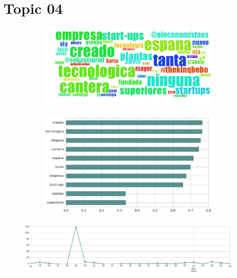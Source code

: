 \section{Topic 04}

\begin{figure}[htbp!]
    \centering
    \begin{subfigure}[b]{0.49\textwidth}
        \includegraphics[width=\textwidth]{twitter_all/report_images/topic-04-wordcloud.jpg}
    \end{subfigure}
    \begin{subfigure}[b]{0.49\textwidth}
        \includegraphics[width=\textwidth]{twitter_all/report_images/topic-04-terms.jpg}
    \end{subfigure}
\end{figure}

\begin{figure}[htbp!]
    \centering
    \includegraphics[width=\textwidth]{twitter_all/report_images/topic-04-timeseries.jpg}
\end{figure}

